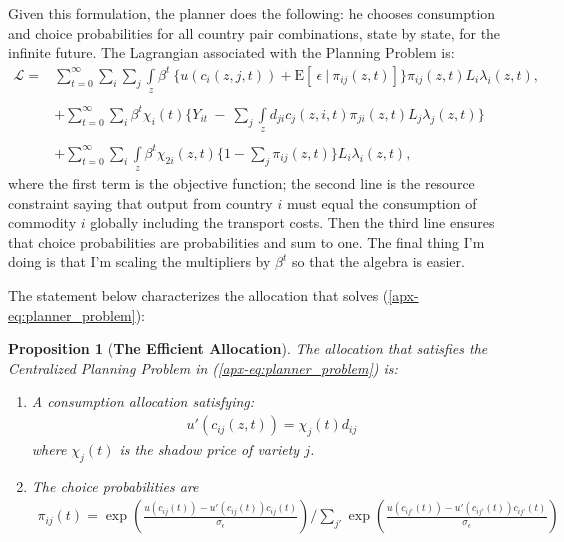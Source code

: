 \documentclass[12pt,pdftex]{article}
\newtheorem{prp}{Proposition}
\begin{document}
\begin{onehalfspacing}
Given this formulation, the planner does the following: he chooses consumption and choice probabilities for all country pair combinations, state by state, for the infinite future. The Lagrangian associated with the Planning Problem is:
\begin{align}
\mathcal{L}  = & \sum_{t=0}^{\infty}   \sum_{i} \sum_{j} \int\limits_{z}  \beta^{t} \  \bigg \{  u(c_{i}(z, j, t) ) + \mathrm{E}[ \ \epsilon \ | \ \pi_{ij}(z,t) ] \bigg \}\pi_{ij}(z,t) L_{i} \lambda_{i}(z, t), \\
\nonumber \\
&+ \sum_{t=0}^{\infty} \sum_{i} \beta^{t} \chi_{i}(t) \bigg \{ Y_{it} \  - \ \sum_{j} \int\limits_{z}  d_{ji} c_{j}(z, i, t) \pi_{ji}(z,t) L_{j}\lambda_{j}(z, t) \bigg \} \nonumber \\
\nonumber \\
&+ \sum_{t=0}^{\infty} \sum_{i} \int\limits_{z}  \beta^{t} \chi_{2i}(z,t) \bigg \{1 - \sum_{j}\pi_{ij}(z,t) \bigg \} L_{i} \lambda_{i}(z, t), \nonumber
\label{apx-eq:planner_problem}
\end{align}
where the first term is the objective function; the second line is the resource constraint saying that output from country $i$ must equal the consumption of commodity $i$ globally including the transport costs. Then the third line ensures that choice probabilities are probabilities and sum to one. The final thing I'm doing is that I'm scaling the multipliers by $\beta^t$ so that the algebra is easier.

The statement below characterizes the allocation that solves (\ref{apx-eq:planner_problem}):
\begin{prp}[\textbf{The Efficient Allocation}]\label{apx-prp:efficient-allocation} The allocation that satisfies the Centralized Planning Problem in (\ref{apx-eq:planner_problem}) is:
\begin{enumerate}
\item A consumption allocation satisfying:
\begin{align}
 u'(c_{ij}(z,t) ) = \chi_{j}(t) d_{ij}
\end{align}
where $\chi_{j}(t)$ is the shadow price of variety $j$.
\item The choice probabilities are
\begin{align}
\pi_{ij}(t) =\exp \left( \frac{u(c_{ij}(t)) - u'(c_{ij}(t))c_{ij}(t)}{\sigma_{\epsilon}}\right) \bigg / \sum_{j'}\exp \left( \frac{u(c_{ij'}(t)) - u'(c_{ij'}(t))c_{ij'}(t)}{\sigma_{\epsilon}} \right)
\label{apx-eq:planner-choice-prob}
\end{align}
\end{enumerate}
\end{prp}


\end{onehalfspacing}
\end{document}
